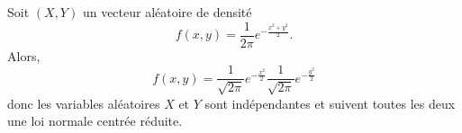 \begin{example}
    Soit \((X,Y)\) un vecteur aléatoire de densité
    \begin{equation*}
        f(x,y) = \frac{1}{2\pi}e^{-\frac{x^2+y^2}{2}}.
    \end{equation*}
    Alors,
    \begin{equation*}
        f(x,y) = \frac{1}{\sqrt{2\pi}}e^{-\frac{x^2}{2}}\frac{1}{\sqrt{2\pi}}e^{-\frac{y^2}{2}}
    \end{equation*}
    donc les variables aléatoires \(X\) et \(Y\) sont indépendantes et
    suivent toutes les deux une loi normale centrée réduite.
\end{example}